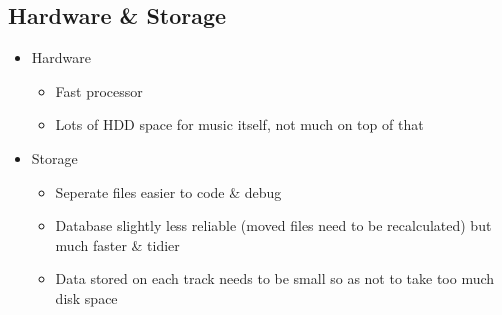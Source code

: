 \subsection{Hardware \& Storage}
\begin{itemize}
	\item Hardware
	\begin{itemize}
		\item Fast processor
		\item Lots of HDD space for music itself, not much on top of that
	\end{itemize}
	\item Storage
	\begin{itemize}
		\item Seperate files easier to code \& debug
		\item Database slightly less reliable (moved files need to be recalculated) but much faster \& tidier
		\item Data stored on each track needs to be small so as not to take too much disk space
	\end{itemize}
\end{itemize}

